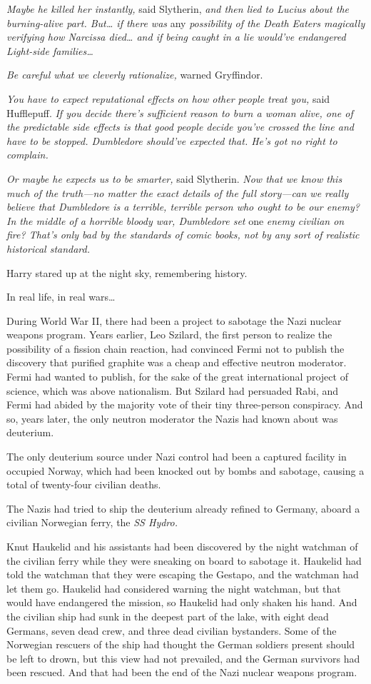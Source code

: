 \emph{Maybe he killed her instantly,} said Slytherin, \emph{and then lied to
Lucius about the burning-alive part. But{\ldots} if there was} any
\emph{possibility of the Death Eaters magically verifying how Narcissa
died{\ldots} and if being caught in a lie would've endangered Light-side
families{\ldots}}

\emph{Be careful what we cleverly rationalize,} warned Gryffindor.

\emph{You have to expect reputational effects on how other people treat you,}
said Hufflepuff. \emph{If you decide there's sufficient reason to burn a woman
alive, one of the predictable side effects is that good people decide you've
crossed the line and have to be stopped. Dumbledore should've expected that.
He's got no right to complain.}

\emph{Or maybe he expects us to be smarter,} said Slytherin. \emph{Now that we
know this much of the truth---no matter the exact details of the full
story---can we really believe that Dumbledore is a terrible, terrible person
who ought to be our enemy? In the middle of a horrible bloody war, Dumbledore
set} one \emph{enemy civilian on fire? That's only bad by the standards of
comic books, not by any sort of realistic historical standard.}

Harry stared up at the night sky, remembering history.

In real life, in real wars{\ldots}

During World War II, there had been a project to sabotage the Nazi nuclear
weapons program. Years earlier, Leo Szilard, the first person to realize the
possibility of a fission chain reaction, had convinced Fermi not to publish the
discovery that purified graphite was a cheap and effective neutron moderator.
Fermi had wanted to publish, for the sake of the great international project of
science, which was above nationalism. But Szilard had persuaded Rabi, and Fermi
had abided by the majority vote of their tiny three-person conspiracy. And so,
years later, the only neutron moderator the Nazis had known about was deuterium.

The only deuterium source under Nazi control had been a captured facility in
occupied Norway, which had been knocked out by bombs and sabotage, causing a
total of twenty-four civilian deaths.

The Nazis had tried to ship the deuterium already refined to Germany, aboard a
civilian Norwegian ferry, the \emph{SS Hydro.}

Knut Haukelid and his assistants had been discovered by the night watchman of
the civilian ferry while they were sneaking on board to sabotage it. Haukelid
had told the watchman that they were escaping the Gestapo, and the watchman had
let them go. Haukelid had considered warning the night watchman, but that would
have endangered the mission, so Haukelid had only shaken his hand. And the
civilian ship had sunk in the deepest part of the lake, with eight dead
Germans, seven dead crew, and three dead civilian bystanders. Some of the
Norwegian rescuers of the ship had thought the German soldiers present should
be left to drown, but this view had not prevailed, and the German survivors had
been rescued. And that had been the end of the Nazi nuclear weapons program.

